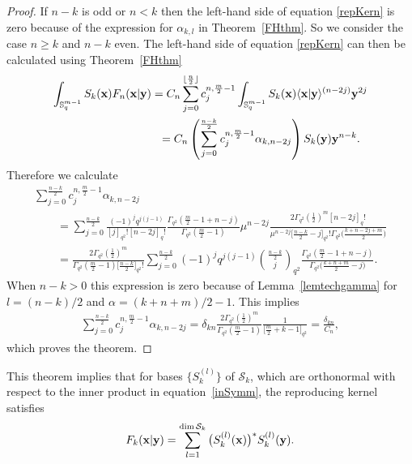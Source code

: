 \documentclass[pdftex]{sigma}
\newcommand{\mS}{\mathbb{S}}
\newcommand{\cS}{\mathcal{S}}
\numberwithin{equation}{section}
\begin{document}
\begin{proof}
If $n-k$ is odd or $n<k$ then the left-hand side of equation \eqref{repKern} is zero because of the expression for $\alpha_{k,l}$ in Theorem~\ref{FHthm}. So we consider the case $n\ge k$ and $n-k$ even. The left-hand side of equation \eqref{repKern} can then be calculated using Theorem~\ref{FHthm}
\begin{gather*}
\int_{\mS^{m-1}_q}S_k(\bold{x})F_n(\bold{x}|\bold{y}) = C_n\sum_{j=0}^{\lfloor \frac{n}{2}\rfloor}c^{n,\frac{m}{2}-1}_j\int_{\mS^{m-1}_q}S_k(\bold{x})\langle\bold{x}|\bold{y}\rangle^{(n-2j)}\bold{y}^{2j}\\
\hphantom{\int_{\mS^{m-1}_q}S_k(\bold{x})F_n(\bold{x}|\bold{y})}{}
= C_n\left(\sum_{j=0}^{\frac{n-k}{2}}c^{n,\frac{m}{2}-1}_j\alpha_{k,n-2j}\right)S_k(\bold{y})\bold{y}^{n-k}.
\end{gather*}
Therefore we calculate
\begin{gather*}
\sum_{j=0}^{\frac{n-k}{2}}c^{n,\frac{m}{2}-1}_j\alpha_{k,n-2j} \\
\qquad{}= \sum_{j=0}^{\frac{n-k}{2}}\frac{(-1)^jq^{j(j-1)}}{[j]_{q^2}![n-2j]_q!}
\frac{\Gamma_{q^2}(\frac{m}{2}-1+n-j)}{\Gamma_{q^2}(\frac{m}{2}-1)}\mu^{n-2j}
\frac{2\Gamma_{q^2}(\frac{1}{2})^m[n-2j]_q!}{\mu^{n-2j}\big[\frac{n-k}{2}-j\big]_{q^2}!\Gamma_{q^2}\big(\frac{k+n-2j+m}{2}\big)}\\
 \qquad{} = \frac{2\Gamma_{q^2}(\frac{1}{2})^m}{\Gamma_{q^2}(\frac{m}{2}-1)\big[\frac{n-k}{2}\big]_{q^2}!}
 \sum_{j=0}^{\frac{n-k}{2}}(-1)^jq^{j(j-1)}\binom{\frac{n-k}{2}}{j}_{q^2}\frac{\Gamma_{q^2}(\frac{m}{2}-1+n-j)}{\Gamma_{q^2}\big(\frac{k+n+m}{2}-j\big)}.
\end{gather*}
When $n-k>0$ this expression is zero because of Lemma~\ref{lemtechgamma} for $l=(n-k)/2$ and $\alpha=(k+n+m)/2-1$. This implies
\begin{gather*}
\sum_{j=0}^{\frac{n-k}{2}}c^{n,\frac{m}{2}-1}_j\alpha_{k,n-2j} = \delta_{kn}\frac{2\Gamma_{q^2}(\frac{1}{2})^m}{\Gamma_{q^2}(\frac{m}{2}-1)}\frac{1}{\big[\frac{m}{2}+k-1\big]_{q^2}}=\frac{\delta_{kn}}{C_n},
\end{gather*}
which proves the theorem.
\end{proof}

This theorem implies that for bases $\{S_k^{(l)}\}$ of $\cS_k$, which are orthonormal with respect to the inner product in equation~\eqref{inSymm}, the reproducing kernel satisf\/ies
\begin{gather*}
F_k(\bold{x}|\bold{y}) = \sum_{l=1}^{\dim \cS_k}\big(S_k^{(l)}(\bold{x})\big)^\ast S_k^{(l)}(\bold{y}).
\end{gather*}
\end{document}
